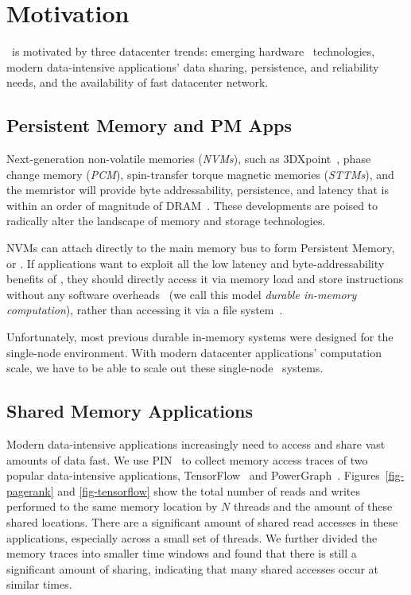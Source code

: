 \section{Motivation}
\label{sec:hotpot:motivation}

\dsnvm\ is motivated by three datacenter trends: 
emerging hardware \nvm\ technologies, 
modern data-intensive applications' data sharing, persistence, and reliability needs, 
and the availability of fast datacenter network.

\subsection{Persistent Memory and PM Apps}
Next-generation non-volatile memories ({\em NVMs}), 
such as 3DXpoint~\cite{Intel3DXpoint}, phase change memory ({\em PCM}),
spin-transfer torque magnetic memories ({\em STTMs}), and the memristor
will provide byte addressability, persistence, and latency that is within 
an order of magnitude of 
DRAM~\cite{hosomi2005novel,Lee10-pcmquest,lee2010phase,lee2011fast,qureshi2010morphable,NVMDB,yang2013memristive,Octopus}.
These developments are poised to radically alter the landscape of memory and storage technologies.

NVMs can attach directly to the main memory bus to form Persistent Memory, or \nvm. 
If applications want to exploit all the low latency and byte-addressability benefits of \nvm,
they should directly access it via memory load and store instructions without any software 
overheads~\cite{Coburn11-ASPLOS,Volos11-ASPLOS,Zhang15-Mojim,Memory-Persistency,Kamino-EuroSys17,pmxact-asplos16} 
(we call this model {\em durable in-memory computation}),
rather than accessing it via a file system~\cite{sosp09:bpfs,Dragojevic14-NSDI,Dulloor14-EuroSys,Xiaojian11-SC,HiNFS-Eurosys16,Octopus}.

Unfortunately, most previous durable in-memory systems were designed for the single-node environment.
With modern datacenter applications' computation scale, 
we have to be able to scale out these single-node \nvm\ systems.




\subsection{Shared Memory Applications}
Modern data-intensive applications increasingly need
to access and share vast amounts of data fast. 
We use PIN~\cite{Luk05-PLDI} to collect memory access traces of two popular data-intensive applications, 
TensorFlow~\cite{TensorFlow} and PowerGraph~\cite{Gonzalez12-OSDI}.
Figures~\ref{fig-pagerank} and \ref{fig-tensorflow} show the total number of reads and writes performed to the same memory location 
by $N$ threads and the amount of these shared locations.
There are a significant amount of shared read accesses in these applications,
especially across a small set of threads.
We further divided the memory traces into smaller time windows 
and found that there is still a significant amount of sharing, 
indicating that many shared accesses occur at similar times. 

